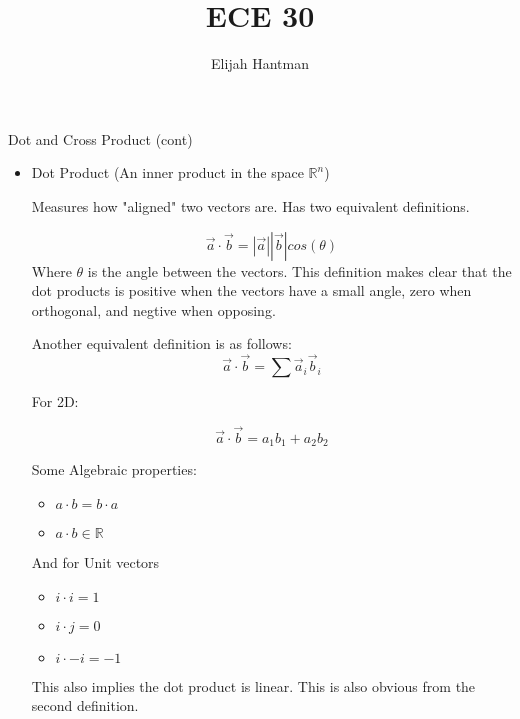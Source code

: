 \documentclass{report}
\title{\Huge{ECE 30}}
\author{\huge{Elijah Hantman}}
\date{}
\begin{document}
\maketitle
\newpage

{\large Dot and Cross Product (cont)}
\begin{itemize}
    \item Dot Product (An inner product in the space $\mathbb{R}^n$)
        \begin{mdframed}
           Measures how "aligned" two vectors are. Has two
           equivalent definitions.

           \begin{displaymath}
               \vec{a} \cdot \vec{b} = 
               |\vec{a}||\vec{b}|cos(\theta)
           \end{displaymath}
           Where $\theta$ is the angle between the vectors. 
           This definition makes clear that the dot products
           is positive when the vectors have a small angle,
           zero when orthogonal, and negtive when opposing.

           Another equivalent definition is as follows:
           \begin{displaymath}
                \vec{a} \cdot \vec{b} =
                \sum \vec{a}_i  \vec{b}_i
           \end{displaymath}

           For 2D:

           \begin{displaymath}
                \vec{a} \cdot \vec{b}
                = a_1  b_1 + a_2  b_2
           \end{displaymath}

           Some Algebraic properties:
           \begin{itemize}
               \item $a \cdot b = b \cdot a$
               \item $a \cdot b \in \mathbb{R}$ 
           \end{itemize}
           And for Unit vectors
           \begin{itemize}
               \item $i \cdot i = 1$
               \item $i \cdot j = 0$
               \item $i \cdot -i = -1$
           \end{itemize}

           This also implies the dot product is linear. This
           is also obvious from the second definition.
           

\end{mdframed}
\end{itemize}
\end{document}
